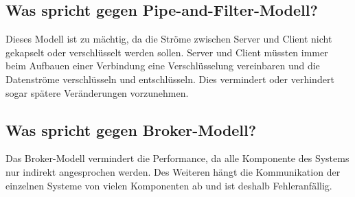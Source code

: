 \subsection*{Was spricht gegen Pipe-and-Filter-Modell?}
Dieses Modell ist zu mächtig, da die Ströme zwischen Server und Client nicht gekapselt oder verschlüsselt werden sollen. Server und Client müssten immer beim Aufbauen einer Verbindung eine Verschlüsselung vereinbaren und die Datenströme verschlüsseln und entschlüsseln. Dies vermindert oder verhindert sogar spätere Veränderungen vorzunehmen.

\subsection*{Was spricht gegen Broker-Modell?}
Das Broker-Modell vermindert die Performance, da alle Komponente des Systems nur indirekt angesprochen werden. Des Weiteren hängt die Kommunikation der einzelnen Systeme von vielen Komponenten ab und ist deshalb Fehleranfällig.
